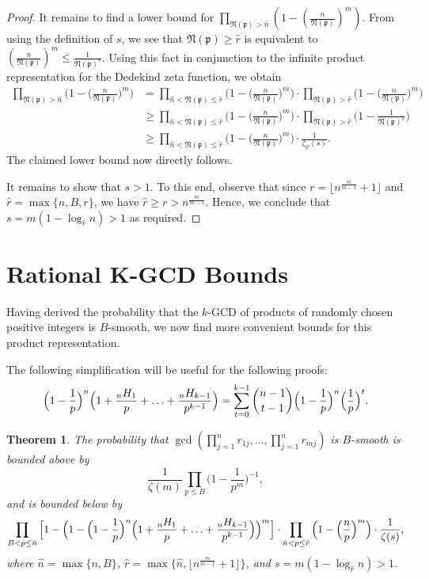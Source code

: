 \documentclass[10pt,a4paper]{article}
\newtheorem{theorem}{Theorem}
\newcommand{\f}[1]{\mathfrak{#1}}
\begin{document}
\begin{proof}
		It remains to find a lower bound for $\prod_{\f{N}(\f{p})>\hat{n}} (1 - (\frac{n}{\f{N}(\f{p})})^m)$. From using the definition of $s$, we see that $\f{N}(\f{p}) \geq \hat{r}$ is equivalent to $(\frac{n}{\f{N}(\f{p})})^m \leq \frac{1}{\f{N}(\f{p})^s}$. Using this fact in conjunction to the infinite product representation for the Dedekind zeta function, we obtain 
		\begin{align*} \prod_{\f{N}(\f{p})>\hat{n}}\Big(1 - \Big(\frac{n}{\f{N}(\f{p})}\Big)^m\Big) &= \prod_{\hat{n}< \f{N}(\f{p}) \leq \hat{r}}\Big(1 - \Big(\frac{n}{\f{N}(\f{p})}\Big)^m\Big) \cdot \prod_{\f{N}{(\f{p})}>\hat{r}}\Big(1 - \Big(\frac{n}{\f{N}(\f{p})}\Big)^m\Big)\\ &\geq  \prod_{\hat{n}< \f{N}(\f{p}) \leq \hat{r}}\Big(1 - \Big(\frac{n}{\f{N}(\f{p})}\Big)^m\Big) \cdot \prod_{\f{N}(\f{p})>\hat{r}}\Big(1 - \frac{1}{\f{N}(\f{p})^s}\Big)\\ &\geq  \prod_{\hat{n}< \f{N}(\f{p}) \leq \hat{r}}\Big(1 - \Big(\frac{n}{\f{N}(\f{p})}\Big)^m\Big) \cdot \frac{1}{\zeta_\mathcal{O}(s)}. \end{align*}
		The claimed lower bound now directly follows. 
		
		\vspace{.1 in}
		
		It remains to show that $s > 1$. To this end, observe that since $r=\lfloor n^{\frac{m}{m-1}}+1\rfloor$ and $\hat{r} = \max\{n, B, r\}$, we have $\hat{r} \geq r > n^{\frac{m}{m-1}}$. Hence, we conclude that $s = m(1 - \log_{\hat{r}}{n}) > 1$ as required.
	\end{proof}

	\section{Rational K-GCD Bounds}
		Having derived the probability that the $k$-GCD of products of randomly chosen positive integers is $B$-smooth, we now find more convenient bounds for this product representation.\newline
		
		The following simplification will be useful for the following proofs:
		\begin{align*}
			\Big(1-\frac{1}{p}\Big)^n\Big(1+\frac{{}_nH_1}{p}+\mathellipsis+\frac{{}_nH_{k-1}}{p^{k-1}}\Big) = \sum_{t=0}^{k-1}\binom{n-1}{t-1}\Big(1-\frac{1}{p}\Big)^n\Big(\frac{1}{{p}}\Big)^t.
		\end{align*}
		
		\begin{theorem} The probability that $\gcd(\prod_{j=1}^n r_{1j}, ..., \prod_{j=1}^{n}r_{mj})$ is $B$-smooth is bounded above by 
			$$\frac{1}{\zeta(m)}\prod_{p\leq B}\Big(1-\frac{1}{p^m}\Big)^{-1},$$
			and is bounded below by 
			$$\prod_{B<p\leq\hat{n}} \Big[1 - \Big(1 -\Big(1-\frac{1}{p}\Big)^n\Big(1+\frac{{}_nH_1}{p}+\mathellipsis+\frac{{}_nH_{k-1}}{p^{k-1}}\Big)\Big)^m\Big] \cdot \prod_{\hat{n}<p\leq\hat{r}} \Big(1 - \Big(\frac{n}{p}\Big)^m\Big) \cdot \frac{1}{\zeta(s)},$$
			where $\hat{n}=\max\{n,B\}$, $\hat{r}=\max\{\hat{n}, \lfloor n^{\frac{m}{m-1}}+1\rfloor\}$, and $s = m(1 - \log_{\hat{r}}{n}) > 1$.
		\end{theorem} 
		
\end{document}
